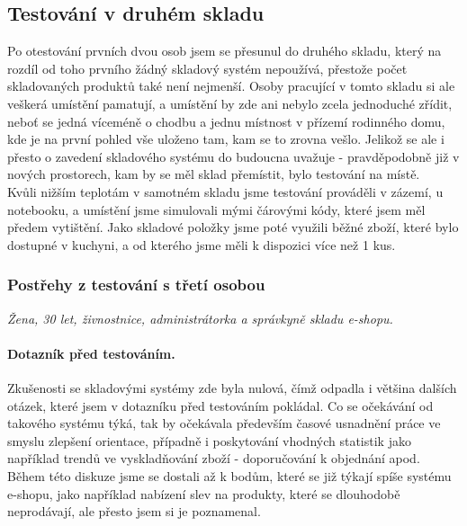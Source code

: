 
\subsection{Testování v druhém skladu}

Po otestování prvních dvou osob jsem se přesunul do druhého skladu, který na rozdíl od toho prvního žádný skladový systém nepoužívá, přestože počet skladovaných produktů také není nejmenší. Osoby pracující v tomto skladu si ale veškerá umístění pamatují, a umístění by zde ani nebylo zcela jednoduché zřídit, neboť se jedná víceméně o chodbu a jednu místnost v přízemí rodinného domu, kde je na první pohled vše uloženo tam, kam se to zrovna vešlo. Jelikož se ale i přesto o zavedení skladového systému do budoucna uvažuje - pravděpodobně již v nových prostorech, kam by se měl sklad přemístit, bylo testování na místě.\\
Kvůli nižším teplotám v samotném skladu jsme testování prováděli v zázemí, u notebooku, a umístění jsme simulovali mými čárovými kódy, které jsem měl předem vytištění. Jako skladové položky jsme poté využili běžné zboží, které bylo dostupné v kuchyni, a od kterého jsme měli k dispozici více než 1 kus.


\subsubsection{Postřehy z testování s třetí osobou}
\emph{Žena, 30 let, živnostnice, administrátorka a správkyně skladu e-shopu.}

\paragraph{Dotazník před testováním.} Zkušenosti se skladovými systémy zde byla nulová, čímž odpadla i většina dalších otázek, které jsem v dotazníku před testováním pokládal. Co se očekávání od takového systému týká, tak by očekávala především časové usnadnění práce ve smyslu zlepšení orientace, případně i poskytování vhodných statistik jako například trendů ve vyskladňování zboží - doporučování k objednání apod. Během této diskuze jsme se dostali až k bodům, které se již týkají spíše systému e-shopu, jako například nabízení slev na produkty, které se dlouhodobě neprodávají, ale přesto jsem si je poznamenal.

